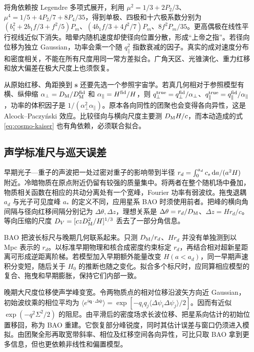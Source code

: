 将角依赖按 Legendre 多项式展开，利用 $\mu^2=1/3+2P_2/3$、$\mu^4=1/5+4P_2/7+8P_4/35$，得到单极、四极和十六极系数分别为 $(b_1^2+2b_1f/3+f^2/5)P_m$、$(4b_1f/3+4f^2/7)P_m$、$8f^2P_m/35$。更高偶极在线性平行视线近似下消失。暗晕内随机速度却使径向位置分散，形成“上帝之指”。若径向位移为独立 Gaussian，功率会乘一个随 $q_\parallel^2$ 指数衰减的因子。真实的成对速度分布和密度相关，不能在所有尺度用同一常方差拟合。广角天区、光锥演化、重力红移和放大偏差在极大尺度上也须恢复。

从原始红移、角距换到 $\bm s$ 还要先选一个参照宇宙学。若真几何相对于参照模型有横、纵伸缩 $\alpha_\perp=D_{\rm M}/D_{\rm M}^{\rm fid}$ 和 $\alpha_\parallel=H^{\rm fid}/H$，则 $q_{\perp}^{\rm true}=q_{\perp}^{\rm fid}/\alpha_\perp$、$q_\parallel^{\rm true}=q_\parallel^{\rm fid}/\alpha_\parallel$，功率的体积因子是 $1/(\alpha_\perp^2\alpha_\parallel)$。原本各向同性的团聚也会变得各向异性，这是 Alcock--Paczyński 效应。比较径向与横向尺度主要测 $D_{\rm M}H/c$，而本动造成的式 \eqref{eq:cosmo-kaiser} 也有角依赖，必须联合拟合。

\subsection{声学标准尺与巡天误差}

早期光子—重子的声波把一处过密对重子的影响带到半径 $r_d=\int_0^{a_d}c_s\,\dd a/(a^2H)$ 附近。冷暗物质在原点附近仍留有较强的质量集中。将两者在整个随机场中叠加，物质相关函数在相应的共动分离处有一个宽峰，Fourier 功率有弱波纹。拖曳退耦 $a_d$ 与光子可见度峰 $a_*$ 的定义不同，应用星系 BAO 时须使用前者。把峰的横向角间隔与径向红移间隔分别记为 $\Delta\theta,\Delta z$，理想关系是 $\Delta\theta=r_d/D_{\rm M}$、$\Delta z=Hr_d/c$。等向压缩的尺度 $D_V=[czD_{\rm M}^2/H]^{1/3}$ 丢去了一部分角信息。

BAO 把波长标尺与晚期几何联系起来。只测 $D_{\rm M}/r_d$、$Hr_d$ 并没有单独测到以 Mpc 表示的 $r_d$。以标准早期物理和核合成密度约束标定 $r_d$，再结合相对超新星距离可形成逆距离阶梯。若模型加入早期额外能量改变 $H(a<a_d)$，同一早期声速积分变短，随后关于 $H_0$ 的推断也随之变化。拟合多个标尺时，应同算相应模型的复合、拖曳和早期膨胀，保持它们内部一致。

晚期大尺度位移使声学峰变宽。令两物质点的相对位移沿波矢方向近 Gaussian，初始波纹乘的相位平均为 $\langle e^{i\bm q\cdot\Delta\bm\psi}\rangle=\exp[-q_iq_j\langle\Delta\psi_i\Delta\psi_j\rangle/2]$。因而有近似 $\exp(-q^2\Sigma^2/2)$ 的阻尼。由平滑后的密度场求长波位移、把星系向估计的初始位置移回，称为 BAO 重建。它恢复部分峰锐度，同时其估计误差与窗口仍须进入模拟。由团聚全形再取宽带斜率、相位及红移空间各向异性，可比只取 BAO 拿到更多信息，但也更依赖非线性和偏置模型。

